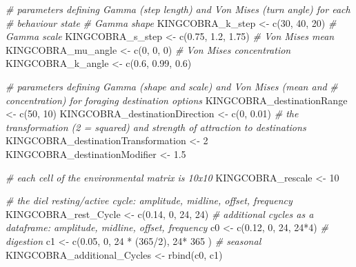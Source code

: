 \documentclass[10pt,a4paper]{article}
\newenvironment{Shaded}{}{}
\newcommand{\CommentTok}[1]{\textit{#1}}
\newcommand{\DecValTok}[1]{#1}
\newcommand{\FloatTok}[1]{#1}
\newcommand{\FunctionTok}[1]{#1}
\newcommand{\NormalTok}[1]{#1}
\newcommand{\OtherTok}[1]{#1}
\newcommand{\SpecialCharTok}[1]{#1}
\begin{document}
\begin{Shaded}
\begin{Highlighting}[]
\CommentTok{\# parameters defining Gamma (step length) and Von Mises (turn angle) for each}
\CommentTok{\# behaviour state}
\CommentTok{\# Gamma shape}
\NormalTok{KINGCOBRA\_k\_step }\OtherTok{\textless{}{-}} \FunctionTok{c}\NormalTok{(}\DecValTok{30}\NormalTok{, }\DecValTok{40}\NormalTok{, }\DecValTok{20}\NormalTok{)}
\CommentTok{\# Gamma scale}
\NormalTok{KINGCOBRA\_s\_step }\OtherTok{\textless{}{-}} \FunctionTok{c}\NormalTok{(}\FloatTok{0.75}\NormalTok{, }\FloatTok{1.2}\NormalTok{, }\FloatTok{1.75}\NormalTok{)}
\CommentTok{\# Von Mises mean}
\NormalTok{KINGCOBRA\_mu\_angle }\OtherTok{\textless{}{-}} \FunctionTok{c}\NormalTok{(}\DecValTok{0}\NormalTok{, }\DecValTok{0}\NormalTok{, }\DecValTok{0}\NormalTok{)}
\CommentTok{\# Von Mises concentration}
\NormalTok{KINGCOBRA\_k\_angle }\OtherTok{\textless{}{-}} \FunctionTok{c}\NormalTok{(}\FloatTok{0.6}\NormalTok{, }\FloatTok{0.99}\NormalTok{, }\FloatTok{0.6}\NormalTok{)}

\CommentTok{\# parameters defining Gamma (shape and scale) and Von Mises (mean and}
\CommentTok{\# concentration) for foraging destination options}
\NormalTok{KINGCOBRA\_destinationRange }\OtherTok{\textless{}{-}} \FunctionTok{c}\NormalTok{(}\DecValTok{50}\NormalTok{, }\DecValTok{10}\NormalTok{)}
\NormalTok{KINGCOBRA\_destinationDirection }\OtherTok{\textless{}{-}} \FunctionTok{c}\NormalTok{(}\DecValTok{0}\NormalTok{, }\FloatTok{0.01}\NormalTok{)}
\CommentTok{\# the transformation (2 = squared) and strength of attraction to destinations}
\NormalTok{KINGCOBRA\_destinationTransformation }\OtherTok{\textless{}{-}} \DecValTok{2}
\NormalTok{KINGCOBRA\_destinationModifier }\OtherTok{\textless{}{-}} \FloatTok{1.5}

\CommentTok{\# each cell of the environmental matrix is 10x10}
\NormalTok{KINGCOBRA\_rescale }\OtherTok{\textless{}{-}} \DecValTok{10}

\CommentTok{\# the diel resting/active cycle: amplitude, midline, offset, frequency}
\NormalTok{KINGCOBRA\_rest\_Cycle }\OtherTok{\textless{}{-}} \FunctionTok{c}\NormalTok{(}\FloatTok{0.14}\NormalTok{, }\DecValTok{0}\NormalTok{, }\DecValTok{24}\NormalTok{, }\DecValTok{24}\NormalTok{)}
\CommentTok{\# additional cycles as a dataframe: amplitude, midline, offset, frequency}
\NormalTok{c0 }\OtherTok{\textless{}{-}} \FunctionTok{c}\NormalTok{(}\FloatTok{0.12}\NormalTok{, }\DecValTok{0}\NormalTok{, }\DecValTok{24}\NormalTok{, }\DecValTok{24}\SpecialCharTok{*}\DecValTok{4}\NormalTok{) }\CommentTok{\# digestion}
\NormalTok{c1 }\OtherTok{\textless{}{-}} \FunctionTok{c}\NormalTok{(}\FloatTok{0.05}\NormalTok{, }\DecValTok{0}\NormalTok{, }\DecValTok{24} \SpecialCharTok{*}\NormalTok{ (}\DecValTok{365}\SpecialCharTok{/}\DecValTok{2}\NormalTok{), }\DecValTok{24}\SpecialCharTok{*} \DecValTok{365}\NormalTok{ ) }\CommentTok{\# seasonal}
\NormalTok{KINGCOBRA\_additional\_Cycles }\OtherTok{\textless{}{-}} \FunctionTok{rbind}\NormalTok{(c0, c1)}


\end{Highlighting}
\end{Shaded}
\end{document}
